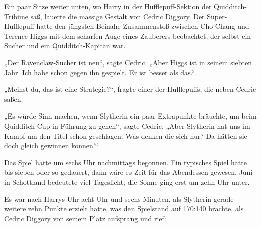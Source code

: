 Ein paar Sitze weiter unten, wo Harry in der Hufflepuff-Sektion der Quidditch-Tribüne saß, lauerte die massige Gestalt von Cedric Diggory. Der Super-Hufflepuff hatte den jüngsten Beinahe-Zusammenstoß zwischen Cho Chang und Terence Higgs mit dem scharfen Auge eines Zauberers beobachtet, der selbst ein Sucher und ein Quidditch-Kapitän war.

„Der Ravenclaw-Sucher ist neu“, sagte Cedric.
„Aber Higgs ist in seinem siebten Jahr. Ich habe schon gegen ihn gespielt. Er ist besser als das.“

„Meinst du, das ist eine Strategie?“, fragte einer der Hufflepuffs, die neben Cedric saßen.

„Es würde Sinn machen, wenn Slytherin ein paar Extrapunkte bräuchte, um beim Quidditch-Cup in Führung zu gehen“, sagte Cedric.
„Aber Slytherin hat uns im Kampf um den Titel schon geschlagen. Was denken die sich nur? Da hätten sie doch gleich gewinnen können!“

Das Spiel hatte um sechs Uhr nachmittags begonnen. Ein typisches Spiel hätte bis sieben oder so gedauert, dann wäre es Zeit für das Abendessen gewesen. Juni in Schottland bedeutete viel Tageslicht; die Sonne ging erst um zehn Uhr unter.

Es war nach Harrys Uhr acht Uhr und sechs Minuten, als Slytherin gerade weitere zehn Punkte erzielt hatte, was den Spielstand auf 170:140 brachte, als Cedric Diggory von seinem Platz aufsprang und rief:

